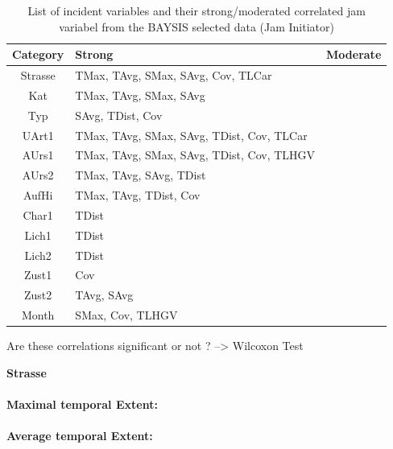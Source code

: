\begin{table}[ht]
\noindent
\begin{table}[ht]
	\centering
	\begin{tabular}{c|l|l}  
		\toprule
		\textbf{Category} & \textbf{Strong} & \textbf{Moderate} \\
		\midrule
		Strasse & TMax, TAvg, SMax, SAvg, Cov, TLCar & \\ 
 		Kat & TMax, TAvg, SMax, SAvg & \\ 
 		Typ & SAvg, TDist, Cov & \\
 		UArt1 & TMax, TAvg, SMax, SAvg, TDist, Cov, TLCar & \\
 		AUrs1 & TMax, TAvg, SMax, SAvg, TDist, Cov, TLHGV & \\
 		AUrs2 & TMax, TAvg, SAvg, TDist & \\
 		AufHi & TMax, TAvg, TDist, Cov & \\
 		Char1 & TDist & \\
 		Lich1 & TDist & \\
 		Lich2 & TDist & \\
 		Zust1 & Cov & \\
 		Zust2 & TAvg, SAvg & \\
 		Month & SMax, Cov, TLHGV & \\
 		\bottomrule
	\end{tabular}
	\caption{List of incident variables and their strong/moderated correlated jam variabel from the BAYSIS selected data (Jam Initiator)}
\end{table}

Are these correlations significant or not ? --> Wilcoxon Test

\large
\centerline{\textbf{Strasse}}
\normalsize

\paragraph{Maximal temporal Extent:}
\paragraph{Average temporal Extent:}

\end{table}
